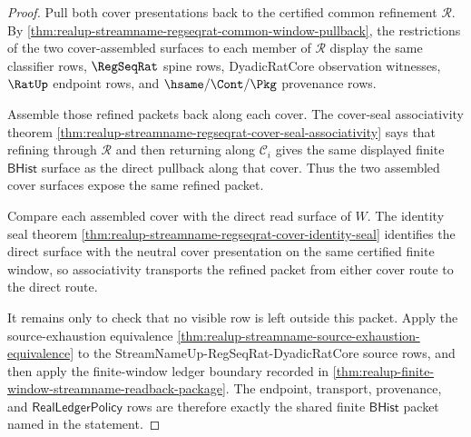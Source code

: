 \begin{proof}
Pull both cover presentations back to the certified common refinement
$\mathcal{R}$. By
\autoref{thm:realup-streamname-regseqrat-common-window-pullback}, the
restrictions of the two cover-assembled surfaces to each member of
$\mathcal{R}$ display the same classifier rows, $\RegSeqRat$ spine rows,
DyadicRatCore observation witnesses, $\RatUp$ endpoint rows, and
$\hsame/\Cont/\Pkg$ provenance rows.

Assemble those refined packets back along each cover. The cover-seal
associativity theorem
\autoref{thm:realup-streamname-regseqrat-cover-seal-associativity} says that
refining through $\mathcal{R}$ and then returning along $\mathcal{C}_i$ gives
the same displayed finite $\mathsf{BHist}$ surface as the direct pullback along
that cover. Thus the two assembled cover surfaces expose the same refined
packet.

Compare each assembled cover with the direct read surface of $W$. The identity
seal theorem
\autoref{thm:realup-streamname-regseqrat-cover-identity-seal} identifies the
direct surface with the neutral cover presentation on the same certified finite
window, so associativity transports the refined packet from either cover route
to the direct route.

It remains only to check that no visible row is left outside this packet.
Apply the source-exhaustion equivalence
\autoref{thm:realup-streamname-source-exhaustion-equivalence} to the
StreamNameUp-RegSeqRat-DyadicRatCore source rows, and then apply the
finite-window ledger boundary recorded in
\autoref{thm:realup-finite-window-streamname-readback-package}. The endpoint,
transport, provenance, and $\mathsf{RealLedgerPolicy}$ rows are therefore
exactly the shared finite $\mathsf{BHist}$ packet named in the statement.
\end{proof}

